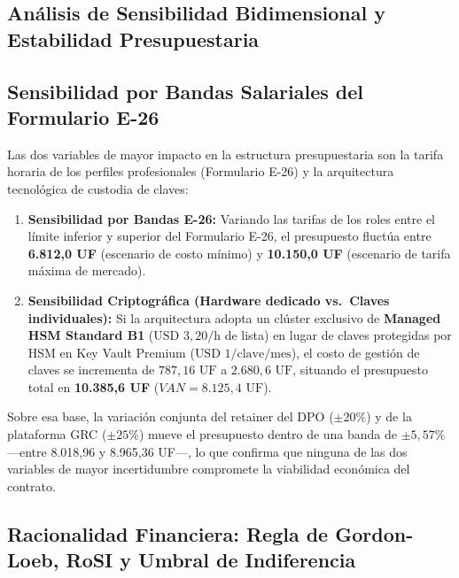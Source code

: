 \subsection{Análisis de Sensibilidad Bidimensional y Estabilidad Presupuestaria}\label{anuxe1lisis-de-sensibilidad-bidimensional-y-estabilidad-presupuestaria}

\subsection{Sensibilidad por Bandas Salariales del Formulario E-26}\label{sensibilidad-por-bandas-salariales-del-formulario-e-26}

Las dos variables de mayor impacto en la estructura presupuestaria son la tarifa horaria de los perfiles profesionales (Formulario E-26) y la arquitectura tecnológica de custodia de claves:

\begin{enumerate}
\def\labelenumi{\arabic{enumi}.}
\tightlist
\item
  \textbf{Sensibilidad por Bandas E-26:} Variando las tarifas de los roles entre el límite inferior y superior del Formulario E-26, el presupuesto fluctúa entre \textbf{6.812,0 UF} (escenario de costo mínimo) y \textbf{10.150,0 UF} (escenario de tarifa máxima de mercado).
\item
  \textbf{Sensibilidad Criptográfica (Hardware dedicado vs.~Claves individuales):} Si la arquitectura adopta un clúster exclusivo de \textbf{Managed HSM Standard B1} (\(\text{USD } 3,20\text{/h}\) de lista) en lugar de claves protegidas por HSM en Key Vault Premium (\(\text{USD } 1\text{/clave/mes}\)), el costo de gestión de claves se incrementa de \(787,16\text{ UF}\) a \(2.680,6\text{ UF}\), situando el presupuesto total en \textbf{10.385,6 UF} (\(VAN = 8.125,4\text{ UF}\)).
\end{enumerate}

Sobre esa base, la variación conjunta del retainer del DPO (\(\pm 20\%\)) y de la plataforma GRC (\(\pm 25\%\)) mueve el presupuesto dentro de una banda de \(\pm 5{,}57\%\) ---entre 8.018,96 y 8.965,36 UF---, lo que confirma que ninguna de las dos variables de mayor incertidumbre compromete la viabilidad económica del contrato.

\subsection{Racionalidad Financiera: Regla de Gordon-Loeb, RoSI y Umbral de Indiferencia}\label{racionalidad-financiera-regla-de-gordon-loeb-rosi-y-umbral-de-indiferencia}

